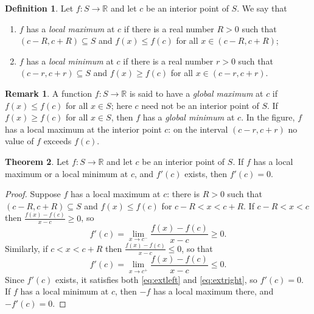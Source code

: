\documentclass[11pt,a4paper]{article}
\numberwithin{equation}{section}
\theoremstyle{definition}
\newtheorem{thm}{Theorem}[subsection]
\newtheorem{defn}[thm]{Definition}
\newtheorem*{remark}{Remark}
\begin{document}
\begin{defn}
Let $f: S\longrightarrow \mathbb{R}$ and let $c$ be an interior point of $S$. We say that
\begin{enumerate}
\item[(i)] $f$ has a \emph{local maximum} at $c$ if there is a real number $R>0$ such that $(c - R, c + R) \subseteq S$ and $f(x) \leq f(c)$ for all $x \in (c-R, c + R)$;
\item[(ii)] $f$ has a \emph{local minimum} at $c$ if there is a real number $r>0$ such that $(c - r, c + r)\subseteq S$ and $f(x)\geq f(c)$ for all $x\in (c - r, c + r)$.
\end{enumerate}
\end{defn}

\begin{remark}
A function $f: S\longrightarrow \mathbb{R}$ is said to have a \emph{global maximum} at $c$ if $f(x)\leq f(c)$ for all $x\in S$; here $c$ need not be an interior point of $S$. If $f(x) \geq f(c)$ for all $x\in S$, then $f$ has a \emph{global minimum} at $c$. In the figure, $f$ has a local maximum at the interior point $c$: on the interval $(c-r,c+r)$ no value of $f$ exceeds $f(c)$.

\begin{figure}[H]
\centering
{}
\end{figure}
\end{remark}


\begin{thm}
Let $f: S\longrightarrow \mathbb{R}$ and let $c$ be an interior point of $S$. If $f$ has a local maximum or a local minimum at $c$, and $f'(c)$ exists, then $f'(c) = 0$.
\end{thm}

\begin{proof}
Suppose $f$ has a local maximum at $c$: there is $R>0$ such that $(c - R, c+ R)\subseteq S$ and $f(x) \leq f(c)$ for $c- R < x < c + R$. If $c - R < x  < c$ then $\frac{f(x) - f(c)}{x - c}\geq 0$, so
\begin{equation}\label{eq:extleft}
f'(c) = \lim_{x\rightarrow c^-} \frac{f(x) - f(c)}{x - c}\geq 0 .
\end{equation}
Similarly, if $c < x < c + R$ then $\frac{f(x) - f(c) }{x - c} \leq 0$, so that
\begin{equation}\label{eq:extright}
f'(c) = \lim_{x\rightarrow c^+} \frac{f(x) - f(c)}{x - c}\leq 0 .
\end{equation}
Since $f'(c)$ exists, it satisfies both \eqref{eq:extleft} and \eqref{eq:extright}, so $f'(c) = 0$. If $f$ has a local minimum at $c$, then $-f$ has a local maximum there, and $-f'(c) = 0$.
\end{proof}
\end{document}
